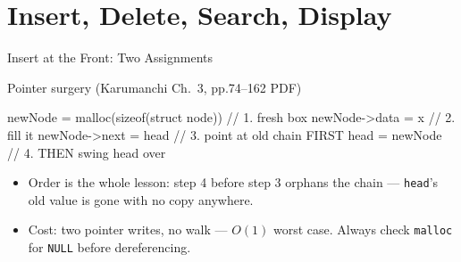 \documentclass[aspectratio=169]{beamer}
\begin{document}
\section{Insert, Delete, Search, Display}


\begin{frame}[fragile]{Insert at the Front: Two Assignments}
  \begin{block}{Pointer surgery (Karumanchi Ch.~3, pp.74--162 PDF)}
\begin{semiverbatim}
newNode = malloc(sizeof(struct node))  // 1. fresh box
newNode->data = x                      // 2. fill it
newNode->next = head                   // 3. point at old chain FIRST
head = newNode                         // 4. THEN swing head over
\end{semiverbatim}
  \end{block}
  \begin{itemize}
    \item Order is the whole lesson: step 4 before step 3 orphans the chain
      --- \texttt{head}'s old value is gone with no copy anywhere.
    \item Cost: two pointer writes, no walk --- $O(1)$ worst case. Always
      check \texttt{malloc} for \texttt{NULL} before dereferencing.
  \end{itemize}
\end{frame}
\end{document}
